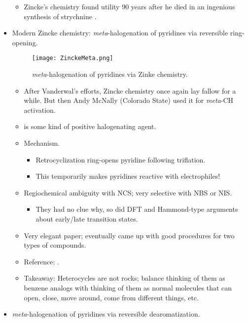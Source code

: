 \documentclass[../notes.tex]{subfiles}
\begin{document}
\begin{itemize}
\begin{itemize}
        \item Zincke's chemistry found utility 90 years after he died in an ingenious synthesis of strychnine \parencite{bib:ZinckeStrychnine}.
    \end{itemize}
    \item Modern Zincke chemistry: \emph{meta}-halogenation of pyridines via reversible ring-opening.
    \begin{figure}[H]
        \centering
        \texttt{[image: ZinckeMeta.png]}
        \caption{\emph{meta}-halogenation of pyridines via Zinke chemistry.}
        \label{fig:ZinckeMeta}
    \end{figure}
    \begin{itemize}
        \item After Vanderwal's efforts, Zincke chemistry once again lay fallow for a while. But then Andy McNally (Colorado State) used it for \emph{meta}-CH activation.
        \item {} is some kind of positive halogenating agent.
        \item Mechanism.
        \begin{itemize}
            \item Retrocyclization ring-opens pyridine following triflation.
            \item This temporarily makes pyridines reactive with electrophiles!
        \end{itemize}
        \item Regiochemical ambiguity with NCS; very selective with NBS or NIS.
        \begin{itemize}
            \item They had no clue why, so did DFT and Hammond-type arguments about early/late transition states.
        \end{itemize}
        \item Very elegant paper; eventually came up with good procedures for two types of compounds.
        \item Reference: \textcite{bib:ZinckeMeta}.
        \item Takeaway: Heterocycles are not rocks; balance thinking of them as benzene analogs with thinking of them as normal molecules that can open, close, move around, come from different things, etc.
    \end{itemize}
    \item \emph{meta}-halogenation of pyridines via reversible dearomatization.
    \begin{figure}[h!]

\end{figure}
\end{itemize}
\end{document}

